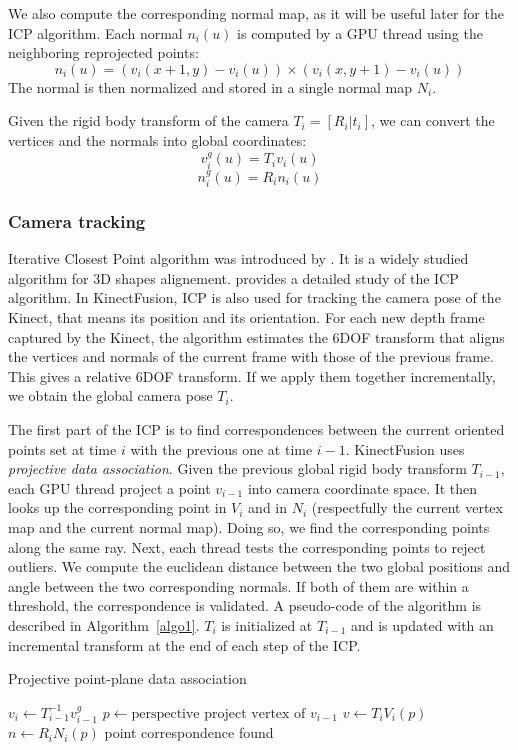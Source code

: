 \documentclass[12pt]{article}
\begin{document}
We also compute the corresponding normal map, as it will be useful later for the ICP algorithm. Each normal $n_i(u)$ is computed by a GPU thread using the neighboring reprojected points:
$$n_i(u) = (v_i(x+1,y) - v_i(u))\times (v_i(x,y+1) - v_i(u))$$
The normal is then normalized and stored in a single normal map $N_i$.

Given the rigid body transform of the camera $T_i = [R_i|t_i]$, we can convert the vertices and the normals into global coordinates:
$$v_i^g(u) = T_iv_i(u)$$
$$n_i^g(u) = R_in_i(u)$$

\subsubsection{Camera tracking}
Iterative Closest Point algorithm was introduced by \cite{ICP1}. It is a widely studied algorithm for 3D shapes alignement. \cite{ICP2} provides a detailed study of the ICP algorithm. In KinectFusion, ICP is also used for tracking the camera pose of the Kinect, that means its position and its orientation. For each new depth frame captured by the Kinect, the algorithm estimates the 6DOF transform that aligns the vertices and normals of the current frame with those of the previous frame. This gives a relative 6DOF transform. If we apply them together incrementally, we obtain the global camera pose $T_i$.

The first part of the ICP is to find correspondences between the current oriented points set at time $i$ with the previous one at time $i-1$. KinectFusion uses \textit{projective data association}. Given the previous global rigid body transform $T_{i-1}$, each GPU thread project a point $v_{i-1}$ into camera coordinate space. It then looks up the corresponding point in $V_i$ and in $N_i$ (respectfully the current vertex map and the current normal map). Doing so, we find the corresponding points along the same ray. Next, each thread tests the corresponding points to reject outliers. We compute the euclidean distance between the two global positions and angle between the two corresponding normals. If both of them are within a threshold, the correspondence is validated. A pseudo-code of the algorithm is described in Algorithm~\ref{algo1}. $T_i$ is initialized at $T_{i-1}$ and is updated with an incremental transform at the end of each step of the ICP.

\begin{algorithm}
\caption{Projective point-plane data association}\label{algo1}
\begin{algorithmic}[1]
  \State $v_i \gets T_{i-1}^{-1}v_{i-1}^g$
  \State $p \gets \text{perspective project vertex of } v_{i-1}$
    \State $v \gets T_iV_i(p)$
    \State $n \gets R_iN_i(p)$
      \State point correspondence found
      \EndIf
    \EndIf
  \EndIf
\EndFor
\end{algorithmic}
\end{algorithm}
\end{document}
